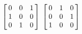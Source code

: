 {$\left[\hskip -3pt \begin{array}{ccc} 0&0&1\\  1&0&0
\\  0&1&0\end{array}\hskip -3pt \right]$ 
}
{$ \left[\hskip -3pt \begin{array}{ccc} 0&1&0\\  0&0&1
\\  1&0&0\end{array}\hskip -3pt \right]$}
